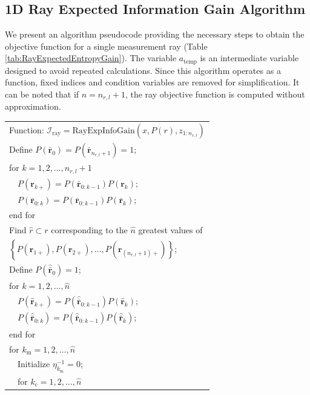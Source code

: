 \documentclass[letterpaper, 10pt, conference]{ieeeconf}
\newcommand{\braces}[1]{\ensuremath{\left\{ #1 \right\}}}
\begin{document}
\subsection{1D Ray Expected Information Gain Algorithm}

We present an algorithm pseudocode providing the necessary steps to obtain the objective function for a single measurement ray (Table \ref{tab:RayExpectedEntropyGain}). The variable $a_\text{temp}$ is an intermediate variable designed to avoid repeated calculations.
Since this algorithm operates as a function, fixed indices and condition variables are removed for simplification. It can be noted that if $\hat n=n_{r,l}+1$, the ray objective function is computed without approximation.

\begin{table}
\begin{tabular}{ l }
  Function: $\mathcal I_\text{ray}=\text{RayExpInfoGain}(x,P(r),z_{1:n_{r,l}})$\\
  Define $P(\bar{\mathbf{r}}_{0})=P(\bar{\mathbf{r}}_{n_{r,l}+1})=1$;\\
  for $k = 1,2,\ldots,n_{r,l}+1$\\
   \ \ $P(\mathbf{r}_{k+}) = P(\bar{\mathbf{r}}_{0:k-1})P(\mathbf{r}_{k})$;\\
   \ \ $P(\bar{\mathbf{r}}_{0:k})=P(\bar{\mathbf{r}}_{0:k-1})P(\bar{\mathbf{r}}_{k})$;\\
  end for\\
  Find $\hat r\subset r$ corresponding to the $\hat n$ greatest values of\\
  $\braces{P(\mathbf{r}_{1+}),P(\mathbf{r}_{2+}),\ldots,P(\mathbf{r}_{(n_{r,l}+1)+})}$;\\
  Define $P(\hat{\bar{\mathbf{r}}}_{0})=1$;\\
  for $k = 1,2,\ldots,\hat{n}$\\
   \ \ $P(\hat{\mathbf{r}}_{k+}) = P(\hat{\bar{\mathbf{r}}}_{0:k-1})P(\hat{\mathbf{r}}_{k})$;\\
   \ \ $P(\hat{\bar{\mathbf{r}}}_{0:k})=P(\hat{\bar{\mathbf{r}}}_{0:k-1})P(\hat{\bar{\mathbf{r}}}_{k})$;\\
  end for\\
  for $k_\text{m}=1,2,\ldots,\hat n$\\
   \ \ Initialize $\eta^{-1}_{k_\text{m}}=0$;\\
   \ \ for $k_\text{c}=1,2,\ldots,\hat n$\\

\end{tabular}
\end{table}
\end{document}
